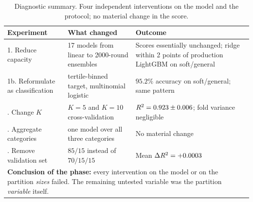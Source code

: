 \begin{table}[htbp]\centering\small
\caption{Diagnostic summary. Four independent interventions on the model
and the protocol; no material change in the score.}
\label{tab:diag_summary}
\begin{tabular}{p{3.3cm}p{4.1cm}p{5.6cm}}
\toprule
Experiment & What changed & Outcome \\
\midrule
1. Reduce capacity & 17 models from linear to 2000-round ensembles &
Scores essentially unchanged; ridge within 2 points of production LightGBM
on soft/general \\
\addlinespace[2pt]
1b. Reformulate as classification & tertile-binned target, multinomial
logistic & $95.2\%$ accuracy on soft/general; same pattern \\
\addlinespace[2pt]
2. Change $K$ & $K = 5$ and $K = 10$ cross-validation &
$R^2 = 0.923 \pm 0.006$; fold variance negligible \\
\addlinespace[2pt]
3. Aggregate categories & one model over all three categories &
No material change \\
\addlinespace[2pt]
4. Remove validation set & $85/15$ instead of $70/15/15$ &
Mean $\Delta R^2 = +0.0003$ \\
\midrule
\multicolumn{3}{p{13.4cm}}{\textbf{Conclusion of the phase:} every
intervention on the model or on the partition \emph{sizes} failed. The
remaining untested variable was the partition \emph{variable} itself.} \\
\bottomrule
\end{tabular}
\end{table}
